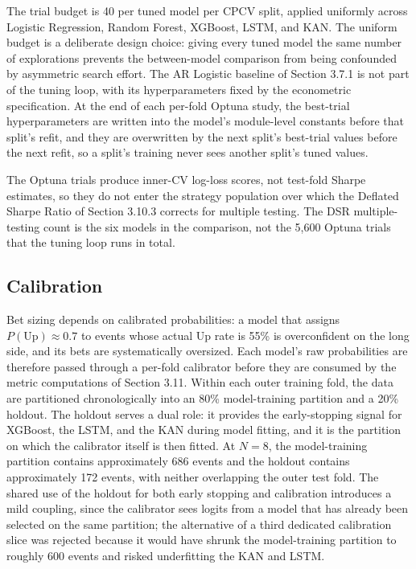 The trial budget is 40 per tuned model per CPCV split, applied uniformly across Logistic Regression, Random Forest, XGBoost, LSTM, and KAN. The uniform budget is a deliberate design choice: giving every tuned model the same number of explorations prevents the between-model comparison from being confounded by asymmetric search effort. The AR Logistic baseline of Section 3.7.1 is not part of the tuning loop, with its hyperparameters fixed by the econometric specification. At the end of each per-fold Optuna study, the best-trial hyperparameters are written into the model's module-level constants before that split's refit, and they are overwritten by the next split's best-trial values before the next refit, so a split's training never sees another split's tuned values.

The Optuna trials produce inner-CV log-loss scores, not test-fold Sharpe estimates, so they do not enter the strategy population over which the Deflated Sharpe Ratio of Section 3.10.3 corrects for multiple testing. The DSR multiple-testing count is the six models in the comparison, not the 5,600 Optuna trials that the tuning loop runs in total.


\subsection{Calibration}\label{subsec:calibration}

Bet sizing depends on calibrated probabilities: a model that assigns $P(\text{Up}) \approx 0.7$ to events whose actual Up rate is 55\% is overconfident on the long side, and its bets are systematically oversized. Each model's raw probabilities are therefore passed through a per-fold calibrator before they are consumed by the metric computations of Section 3.11. Within each outer training fold, the data are partitioned chronologically into an 80\% model-training partition and a 20\% holdout. The holdout serves a dual role: it provides the early-stopping signal for XGBoost, the LSTM, and the KAN during model fitting, and it is the partition on which the calibrator itself is then fitted. At $N = 8$, the model-training partition contains approximately 686 events and the holdout contains approximately 172 events, with neither overlapping the outer test fold. The shared use of the holdout for both early stopping and calibration introduces a mild coupling, since the calibrator sees logits from a model that has already been selected on the same partition; the alternative of a third dedicated calibration slice was rejected because it would have shrunk the model-training partition to roughly 600 events and risked underfitting the KAN and LSTM.

